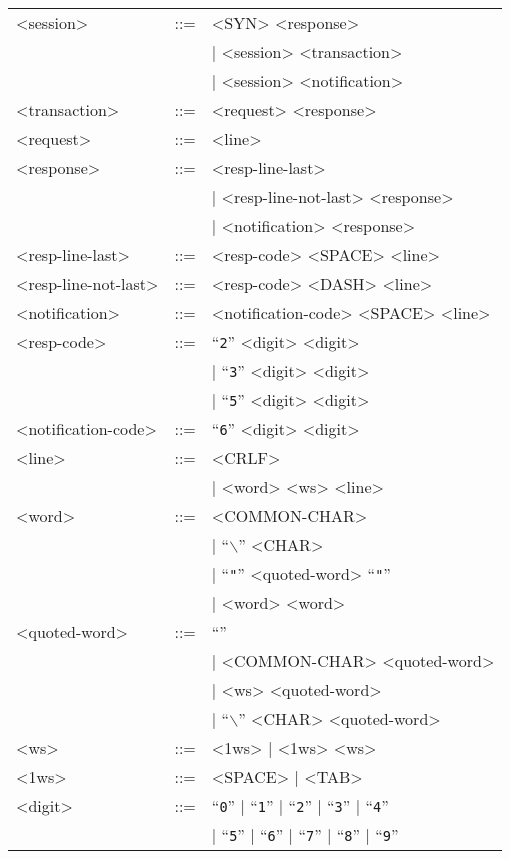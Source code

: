 \documentclass[twoside,a4paper,11pt]{article}
\begin{document}
\begin{tabular}{lcl}
<session> & ::= & <SYN> <response> \\
 & & | <session> <transaction> \\
 & & | <session> <notification> \\
<transaction> & ::= & <request> <response> \\
<request> & ::= & <line> \\
<response> & ::= & <resp-line-last> \\
 & & | <resp-line-not-last> <response> \\
 & & | <notification> <response> \\
<resp-line-last> & ::= & <resp-code> <SPACE> <line> \\
<resp-line-not-last> & ::= & <resp-code> <DASH> <line> \\
<notification> & ::= & <notification-code> <SPACE> <line> \\
<resp-code> & ::= & ``\texttt{2}'' <digit> <digit> \\
 & & | ``\texttt{3}'' <digit> <digit> \\
 & & | ``\texttt{5}'' <digit> <digit> \\
<notification-code> & ::= & ``\texttt{6}'' <digit> <digit> \\
<line> & ::= & <CRLF> \\
 & & | <word> <ws> <line> \\
<word> & ::= & <COMMON-CHAR> \\
 & & | ``\texttt{$\backslash$}'' <CHAR> \\
 & & | ``\texttt{"}'' <quoted-word> ``\texttt{"}'' \\
 & & | <word> <word> \\
<quoted-word> & ::= & ``'' \\
 & & | <COMMON-CHAR> <quoted-word> \\
 & & | <ws> <quoted-word> \\
 & & | ``\texttt{$\backslash$}'' <CHAR> <quoted-word> \\
<ws> & ::= & <1ws> | <1ws> <ws> \\
<1ws> & ::= & <SPACE> | <TAB> \\
<digit> & ::= & ``\texttt{0}'' |
``\texttt{1}'' | ``\texttt{2}'' |
``\texttt{3}'' | ``\texttt{4}'' \\
& & | ``\texttt{5}'' | ``\texttt{6}'' |
``\texttt{7}'' | ``\texttt{8}'' |
``\texttt{9}''
\end{tabular}
\end{document}
